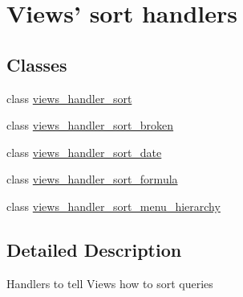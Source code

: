 \hypertarget{group__views__sort__handlers}{
\section{Views' sort handlers}
\label{group__views__sort__handlers}
}
\subsection*{Classes}
\begin{CompactItemize}
\item 
class \hyperlink{classviews__handler__sort}{views\_\-handler\_\-sort}
\item 
class \hyperlink{classviews__handler__sort__broken}{views\_\-handler\_\-sort\_\-broken}
\item 
class \hyperlink{classviews__handler__sort__date}{views\_\-handler\_\-sort\_\-date}
\item 
class \hyperlink{classviews__handler__sort__formula}{views\_\-handler\_\-sort\_\-formula}
\item 
class \hyperlink{classviews__handler__sort__menu__hierarchy}{views\_\-handler\_\-sort\_\-menu\_\-hierarchy}
\end{CompactItemize}


\subsection{Detailed Description}
Handlers to tell Views how to sort queries 